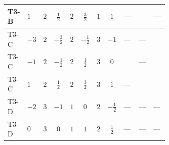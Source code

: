 \documentclass[8pt]{article}
\begin{document}
\begin{landscape}
\begin{longtable}{@{}llcccccc >{\raggedright\arraybackslash}p{0.21\linewidth} >{\raggedright\arraybackslash}p{0.21\linewidth} >{\raggedright\arraybackslash}p{0.21\linewidth}@{}}
\midrule
T3-B & $1$ & $2$ & $\frac{1}{2}$ & $2$ & $\frac{3}{2}$ & $1$ & $1$ & --- & \scriptsize\adjustbox{max width=\linewidth}{$\begin{gathered} +{g_1}^2 \left(6 {g_2}^2-3 {\lambda_{HS_1}^{(A)}}\right)\end{gathered}$} & --- \\
\midrule
T3-C & $-3$ & $2$ & $-\frac{3}{2}$ & $2$ & $-\frac{1}{2}$ & $3$ & $-1$ & --- & --- & \scriptsize\adjustbox{max width=\linewidth}{$\begin{gathered} {\lambda_{HS_1}^{(A)}} (3 T_{\nu}^{(1)}+6 \operatorname{Tr}\!\left({Y_d}\,\left({Y_d}\right)^{\dagger}\right)+2 \operatorname{Tr}\!\left({Y_e}\,\left({Y_e}\right)^{\dagger}\right)+6 \operatorname{Tr}\!\left({Y_u}\,\left({Y_u}\right)^{\dagger}\right))\end{gathered}$} \\
\midrule
T3-C & $-1$ & $2$ & $-\frac{1}{2}$ & $2$ & $\frac{1}{2}$ & $3$ & $0$ & \scriptsize\adjustbox{max width=\linewidth}{$\begin{gathered} -\frac{4}{3} {\lambda_{11}} \left({\lambda_{H H^\dagger S_1^\dagger S_2^\dagger}^{\rm Cross}}\right)^{*}\end{gathered}$} & --- & \scriptsize\adjustbox{max width=\linewidth}{$\begin{gathered} {\lambda_{HS_1}^{(A)}} (3 T_{\nu}^{(1)}+6 \operatorname{Tr}\!\left({Y_d}\,\left({Y_d}\right)^{\dagger}\right)+2 \operatorname{Tr}\!\left({Y_e}\,\left({Y_e}\right)^{\dagger}\right)+6 \operatorname{Tr}\!\left({Y_u}\,\left({Y_u}\right)^{\dagger}\right))\end{gathered}$} \\
\midrule
T3-C & $1$ & $2$ & $\frac{1}{2}$ & $2$ & $\frac{3}{2}$ & $3$ & $1$ & --- & \scriptsize\adjustbox{max width=\linewidth}{$\begin{gathered} +{g_1}^2 \left(6 {g_2}^2-3 {\lambda_{HS_1}^{(A)}}\right)\end{gathered}$} & \scriptsize\adjustbox{max width=\linewidth}{$\begin{gathered} {\lambda_{HS_1}^{(A)}} (3 T_{\nu}^{(1)}+6 \operatorname{Tr}\!\left({Y_d}\,\left({Y_d}\right)^{\dagger}\right)+2 \operatorname{Tr}\!\left({Y_e}\,\left({Y_e}\right)^{\dagger}\right)+6 \operatorname{Tr}\!\left({Y_u}\,\left({Y_u}\right)^{\dagger}\right))\end{gathered}$} \\
\midrule
T3-D & $-2$ & $3$ & $-1$ & $1$ & $0$ & $2$ & $-\frac{1}{2}$ & --- & --- & --- \\
\midrule
T3-D & $0$ & $3$ & $0$ & $1$ & $1$ & $2$ & $\frac{1}{2}$ & --- & --- & --- \\

\end{longtable}
\end{landscape}
\end{document}
